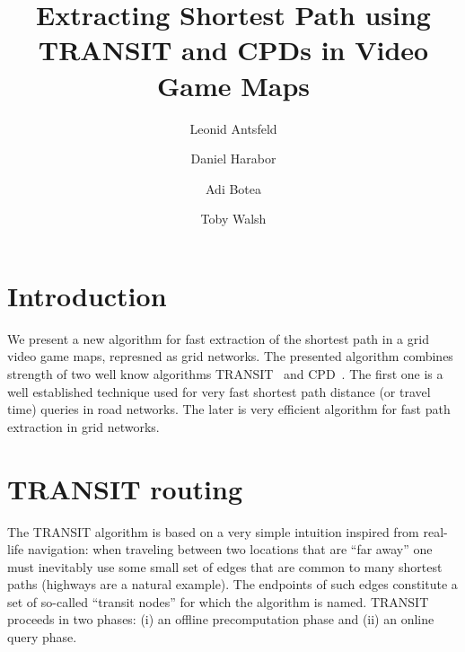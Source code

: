 \documentclass[runningheads,a4paper]{llncs}
\begin{document}
\mainmatter  %

\title{Extracting Shortest Path using TRANSIT and CPDs in Video Game Maps}


%
%
\author{Leonid Antsfeld \and Daniel Harabor \and Adi  Botea  \and Toby Walsh}



\maketitle

\section{Introduction}
We present a new algorithm for fast extraction of the shortest path in a grid video game maps, represned as grid networks.
The presented algorithm combines strength of two well know algorithms TRANSIT~\cite{bast06} and CPD~\cite{sanka05}.
The first one is a well established technique used for very fast shortest path distance (or travel time) queries in road networks.
The later is very efficient algorithm for fast path extraction in grid networks.

\section{TRANSIT routing}\label{sec:transit}


The TRANSIT algorithm is based on a very simple intuition inspired from real-life navigation: when traveling
between two locations that are ``far away'' one must inevitably use some small set of edges that
are common to many shortest paths (highways are a natural example).
The endpoints of such edges constitute a set of so-called ``transit nodes'' for which the algorithm is named.
TRANSIT proceeds in two phases: (i) an offline precomputation phase and (ii) an online query phase.
\end{document}
